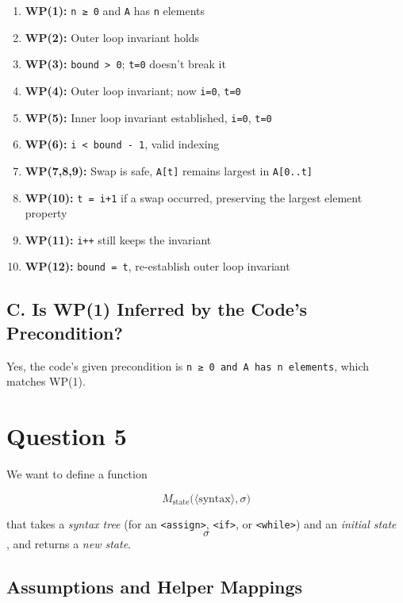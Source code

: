 \documentclass[12pt]{article}
\begin{document}
    \begin{enumerate}
        \item \textbf{WP(1):} \texttt{n ≥ 0} and \texttt{A} has \texttt{n} elements
        \item \textbf{WP(2):} Outer loop invariant holds
        \item \textbf{WP(3):} \texttt{bound > 0}; \texttt{t=0} doesn’t break it
        \item \textbf{WP(4):} Outer loop invariant; now \texttt{i=0}, \texttt{t=0}
        \item \textbf{WP(5):} Inner loop invariant established, \texttt{i=0}, \texttt{t=0}
        \item \textbf{WP(6):} \texttt{i < bound - 1}, valid indexing
        \item \textbf{WP(7,8,9):} Swap is safe, \texttt{A[t]} remains largest in \texttt{A[0..t]}
        \item \textbf{WP(10):} \texttt{t = i+1} if a swap occurred, preserving the largest element property
        \item \textbf{WP(11):} \texttt{i++} still keeps the invariant
        \item \textbf{WP(12):} \texttt{bound = t}, re-establish outer loop invariant
    \end{enumerate}

    \subsection*{C. Is WP(1) Inferred by the Code’s Precondition?}

    Yes, the code’s given precondition is \texttt{n ≥ 0 and A has n elements}, which matches WP(1).

    \section*{Question 5}

    We want to define a function

    $$
    M_{\text{state}}\bigl(\langle \text{syntax} \rangle, \sigma\bigr)
    $$

    that takes a \emph{syntax tree} (for an \texttt{<assign>}, \texttt{<if>}, or \texttt{<while>}) and an \emph{initial state}
    $$\sigma$$,
    and returns a \emph{new state}.

    \subsection*{Assumptions and Helper Mappings}
\end{document}
